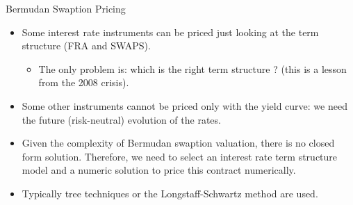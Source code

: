 \documentclass{beamer}
\begin{document}

\begin{frame}{Bermudan Swaption Pricing}
\begin{itemize}
	\item Some interest rate instruments can be priced just looking at the term structure (FRA and SWAPS).
	\begin{itemize}
		\item The only problem is: which is the right term structure ? (this is a lesson from the 2008 crisis).
	\end{itemize}
	\item Some other instruments cannot be priced only with the yield curve: we need the future (risk-neutral) evolution of the rates.
	\item Given the complexity of Bermudan swaption valuation, there is no closed form solution. Therefore, we need to select an interest rate term structure model and a numeric solution to price this contract numerically.		
	\item Typically tree techniques or the Longstaff-Schwartz method are used.
\end{itemize}
\end{frame}
\end{document}
